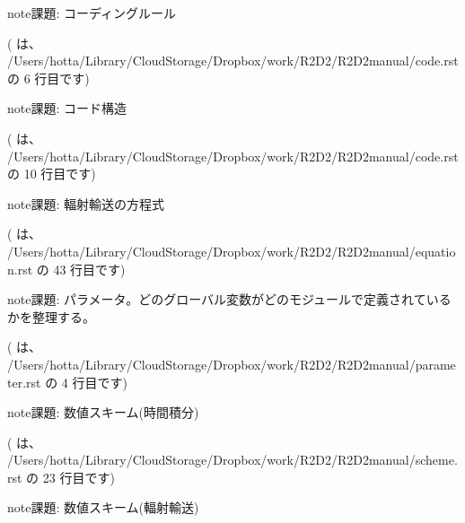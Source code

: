 \documentclass[letterpaper,10pt,dvipdfmx,report]{sphinxmanual}
\begin{document}
\begin{sphinxadmonition}{note}{課題:}
\sphinxAtStartPar
コーディングルール
\end{sphinxadmonition}

\sphinxAtStartPar
({\hyperref[\detokenize{code:id3}]{}} は、 /Users/hotta/Library/CloudStorage/Dropbox/work/R2D2/R2D2\sphinxhyphen{}manual/code.rst の 6 行目です)

\begin{sphinxadmonition}{note}{課題:}
\sphinxAtStartPar
コード構造
\end{sphinxadmonition}

\sphinxAtStartPar
({\hyperref[\detokenize{code:id5}]{}} は、 /Users/hotta/Library/CloudStorage/Dropbox/work/R2D2/R2D2\sphinxhyphen{}manual/code.rst の 10 行目です)

\begin{sphinxadmonition}{note}{課題:}
\sphinxAtStartPar
輻射輸送の方程式
\end{sphinxadmonition}

\sphinxAtStartPar
({\hyperref[\detokenize{equation:id4}]{}} は、 /Users/hotta/Library/CloudStorage/Dropbox/work/R2D2/R2D2\sphinxhyphen{}manual/equation.rst の 43 行目です)

\begin{sphinxadmonition}{note}{課題:}
\sphinxAtStartPar
パラメータ。どのグローバル変数がどのモジュールで定義されているかを整理する。
\end{sphinxadmonition}

\sphinxAtStartPar
({\hyperref[\detokenize{parameter:id2}]{}} は、 /Users/hotta/Library/CloudStorage/Dropbox/work/R2D2/R2D2\sphinxhyphen{}manual/parameter.rst の 4 行目です)

\begin{sphinxadmonition}{note}{課題:}
\sphinxAtStartPar
数値スキーム(時間積分)
\end{sphinxadmonition}

\sphinxAtStartPar
({\hyperref[\detokenize{scheme:id4}]{}} は、 /Users/hotta/Library/CloudStorage/Dropbox/work/R2D2/R2D2\sphinxhyphen{}manual/scheme.rst の 23 行目です)

\begin{sphinxadmonition}{note}{課題:}
\sphinxAtStartPar
数値スキーム(輻射輸送)
\end{sphinxadmonition}
\end{document}
